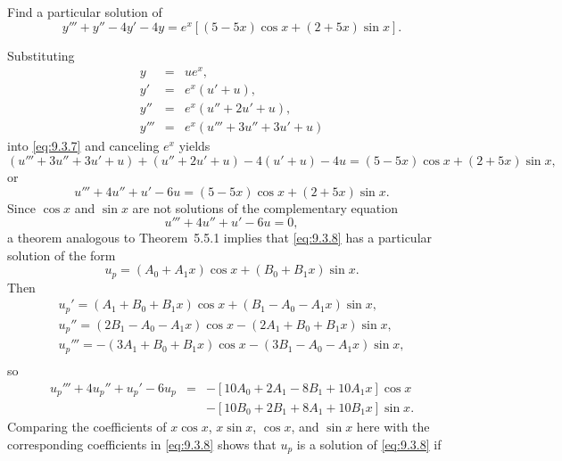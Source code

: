 \setcounter{example}{2}
\setcounter{equation}{6}
\begin{example}
  \label{example:9.3.3} \rm Find a particular solution of
  \begin{equation}
    \label{eq:9.3.7}y'''+y''-4y'-4y=e^{x}[(5-5x)\cos x+(2+5x)\sin x].
  \end{equation}
\end{example}
\setcounter{equation}{7}
\setcounter{figure}{2}
\begin{examplesolution}
\solution Substituting
\begin{eqnarray*}
  y    & = & ue^{x},           \\
  y'   & = & e^{x}(u'+u),      \\
  y''  & = & e^{x}(u''+2u'+u), \\
  y''' & = & e^{x}(u'''+3u''+3u'+u)
\end{eqnarray*}
into \eqref{eq:9.3.7} and canceling $e^{x}$ yields
\[
  (u'''+3u''+3u'+u)+(u''+2u'+u)-4(u'+u)-4u =(5-5x)\cos x+(2+5x)\sin x,
\]
or
\begin{equation}
  \label{eq:9.3.8}u'''+4u''+u'-6u=(5-5x)\cos x+(2+5x)\sin x.
\end{equation}
Since $\cos x$ and $\sin x$ are not solutions of the complementary equation
\[
  u'''+4u''+u'-6u=0,
\]
a theorem analogous to Theorem~5.5.1 implies that \eqref{eq:9.3.8} has a particular
solution of the form
\begin{equation}
  \label{eq:9.3.9}u_{p}=(A_{0}+A_{1}x)\cos x+(B_{0}+B_{1}x)\sin x.
\end{equation}
Then
\begin{eqnarray*}
  u_{p}'=(A_{1}+B_{0}+B_{1}x)\cos x+(B_{1}-A_{0}-A_{1}x)\sin x,\\ u_{p}''=(2B_{1}-A_{0}-A_{1}x)\cos x-(2A_{1}+B_{0}+B_{1}x)\sin x,\\ u_{p}'''=-(3A_{1}+B_{0}+B_{1}x)\cos x-(3B_{1}-A_{0}-A_{1}x)\sin x,\\
\end{eqnarray*}
so
\[
  \begin{array}{rcl}
    u_{p}'''+4u_{p}''+u_{p}'-6u_{p} & = & -\left[10A_{0}+2A_{1}-8B_{1}+10A_{1}x\right]\cos x  \\
                                    &   & -\left[10B_{0}+2B_{1}+8A_{1}+10B_{1}x\right]\sin x.
  \end{array}
\]
Comparing the coefficients of $x\cos x$, $x\sin x$, $\cos x$, and $\sin x$ here with the
corresponding coefficients in \eqref{eq:9.3.8} shows that $u_{p}$ is a solution of \eqref{eq:9.3.8}
if
\[
  \begin{array}{rcr}

\end{array}\]
\end{examplesolution}
